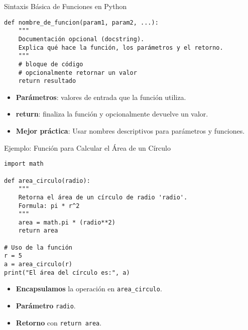 \documentclass[10pt]{beamer}
\begin{document}
\begin{frame}[fragile]{Sintaxis Básica de Funciones en Python}
\begin{verbatim}
def nombre_de_funcion(param1, param2, ...):
    """
    Documentación opcional (docstring).
    Explica qué hace la función, los parámetros y el retorno.
    """
    # bloque de código
    # opcionalmente retornar un valor
    return resultado
\end{verbatim}

\begin{itemize}
  \item \textbf{Parámetros}: valores de entrada que la función utiliza.
  \item \textbf{return}: finaliza la función y opcionalmente devuelve un valor.
  \item \textbf{Mejor práctica}: Usar nombres descriptivos para parámetros y funciones.
\end{itemize}
\end{frame}

\begin{frame}[fragile]{Ejemplo: Función para Calcular el Área de un Círculo}
\begin{verbatim}
import math

def area_circulo(radio):
    """
    Retorna el área de un círculo de radio 'radio'.
    Formula: pi * r^2
    """
    area = math.pi * (radio**2)
    return area

# Uso de la función
r = 5
a = area_circulo(r)
print("El área del círculo es:", a)
\end{verbatim}

\begin{itemize}\tiny
  \item \textbf{Encapsulamos} la operación en \texttt{area\_circulo}.
  \item \textbf{Parámetro} \texttt{radio}.
  \item \textbf{Retorno} con \texttt{return area}.
\end{itemize}
\end{frame}

\end{document}
